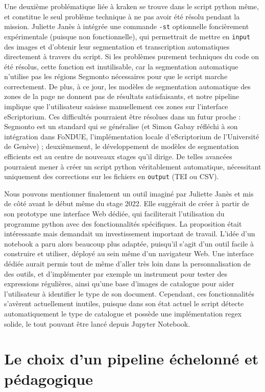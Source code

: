 \documentclass[a4paper,12pt,twoside]{book}
\begin{document}
Une deuxième problématique liée à kraken se trouve dans le script python même, et constitue le seul problème technique à ne pas avoir été résolu pendant la mission. Juliette Janès à intégrée une commande \texttt{-st} optionnelle foncièrement expérimentale (puisque non fonctionnelle), qui permettrait de mettre en \texttt{input} des images et d'obtenir leur segmentation et transcription automatiques directement à travers du script. Si les problèmes purement techniques du code on été résolus, cette fonction est inutilisable, car la segmentation automatique n'utilise pas les régions Segmonto nécessaires pour que le script marche correctement. De plus, à ce jour, les modèles de segmentation automatique des zones de la page ne donnent pas de résultats satisfaisants, et notre pipeline implique que l'utilisateur saisisse manuellement ces zones sur l'interface eScriptorium. Ces difficultés pourraient être résolues dans un futur proche : Segmonto est un standard qui se généralise (et Simon Gabay réfléchi à son intégration dans FoNDUE, l'implémentation locale d'eScriptorium de l'Université de Genève) ; deuxièmement, le développement de modèles de segmentation efficients est au centre de nouveaux stages qu'il dirige. De telles avancées pourraient mener à créer un script python véritablement automatique, nécessitant uniquement des corrections sur les fichiers en \texttt{output} (TEI ou CSV). 

Nous pouvons mentionner finalement un outil imaginé par Juliette Janès et mis de côté avant le début même du stage 2022. Elle suggérait de créer à partir de son prototype une interface Web dédiée, qui faciliterait l'utilisation du programme python avec des fonctionnalités spécifiques. La proposition était intéressante mais demandait un investissement important de travail. L'idée d'un notebook a paru alors beaucoup plus adaptée, puisqu'il s'agit d'un outil facile à construire et utiliser, déployé au sein même d'un navigateur Web. Une interface dédiée aurait permis tout de même d'aller très loin dans la personnalisation de des outils, et d'implémenter par exemple un instrument pour tester des expressions régulières, ainsi qu'une base d'images de catalogue pour aider l'utilisateur à identifier le type de son document. Cependant, ces fonctionnalités s'avèrent actuellement inutiles, puisque dans son état actuel le script détecte automatiquement le type de catalogue et possède une implémentation regex solide, le tout pouvant être lancé depuis Jupyter Notebook.




\section{Le choix d'un pipeline échelonné et pédagogique}
\end{document}
